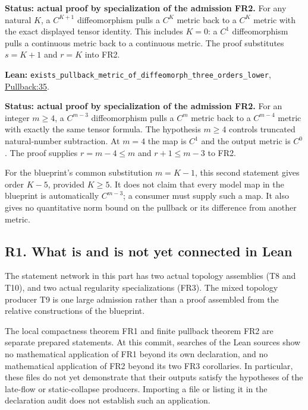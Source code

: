 \documentclass[
  letterpaper,
  11pt]{article}
\begin{document}
\textbf{Status: actual proof by specialization of the admission FR2.}
For any natural \(K\), a \(C^{K+1}\) diffeomorphism pulls a \(C^K\)
metric back to a \(C^K\) metric with the exact displayed tensor
identity. This includes \(K=0\): a \(C^1\) diffeomorphism pulls a
continuous metric back to a continuous metric. The proof substitutes
\(s=K+1\) and \(r=K\) into FR2.

\textbf{Lean:}
{\small\texttt{exists\_\allowbreak{}pullback\_\allowbreak{}metric\_\allowbreak{}of\_\allowbreak{}diffeomorph\_\allowbreak{}three\_\allowbreak{}orders\_\allowbreak{}lower}},
\href{https://github.com/qinz1yang/differential-geometry-dev/blob/ea0fae60ee01ef8c8d9b57a51794c6538f679c5d/DifferentialGeometry/Geometry/Metric/Pullback/FiniteRegularity.lean\#L35}{Pullback:35}.

\textbf{Status: actual proof by specialization of the admission FR2.}
For an integer \(m\geq4\), a \(C^{m-3}\) diffeomorphism pulls a \(C^m\)
metric back to a \(C^{m-4}\) metric with exactly the same tensor
formula. The hypothesis \(m\geq4\) controls truncated natural-number
subtraction. At \(m=4\) the map is \(C^1\) and the output metric is
\(C^0\). The proof supplies \(r=m-4\leq m\) and \(r+1\leq m-3\) to FR2.

For the blueprint's common substitution \(m=K-1\), this second statement
gives order \(K-5\), provided \(K\geq5\). It does not claim that every
model map in the blueprint is automatically \(C^{m-3}\); a consumer must
supply such a map. It also gives no quantitative norm bound on the
pullback or its difference from another metric.

\subsection{R1. What is and is not yet connected in
Lean}\label{topology-r1}

The statement network in this part has two actual topology assemblies
(T8 and T10), and two actual regularity specializations (FR3). The mixed
topology producer T9 is one large admission rather than a proof
assembled from the relative constructions of the blueprint.

The local compactness theorem FR1 and finite pullback theorem FR2 are
separate prepared statements. At this commit, searches of the Lean
sources show no mathematical application of FR1 beyond its own
declaration, and no mathematical application of FR2 beyond its two FR3
corollaries. In particular, these files do not yet demonstrate that
their outputs satisfy the hypotheses of the late-flow or static-collapse
producers. Importing a file or listing it in the declaration audit does
not establish such an application.
\end{document}
